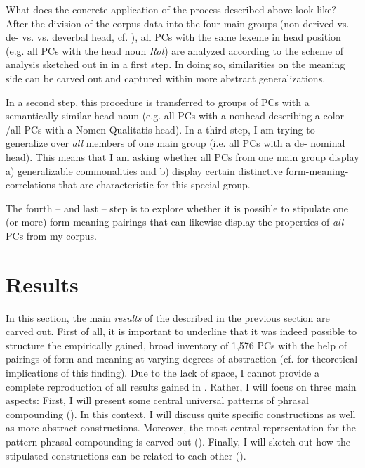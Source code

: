 \documentclass[output=paper]{LSP/langsci}
\begin{document}
What does the concrete application of the process described above look like? After the division of the corpus data into the four main groups (non-derived vs. de- vs.  vs. deverbal head, cf. ), all PCs with the same lexeme in head position (e.g. all PCs with the head noun \textit{Rot}) are analyzed according to the scheme of analysis sketched out in  in a first step. In doing so, similarities on the meaning side can be carved out and captured within more abstract generalizations. 



In a second step, this procedure is transferred to groups of PCs with a semantically similar head noun (e.g. all PCs with a nonhead describing a color \slash  all PCs with a Nomen Qualitatis head). In a third step, I am trying to generalize over \textit{all} members of one main group (i.e. all PCs with a de- nominal head). This means that I am asking whether all PCs from one main group display a) generalizable commonalities and b) display certain distinctive form-meaning-correlations that are characteristic for this special group. 



The fourth -- and last -- step is to explore whether it is possible to stipulate one (or more) form-meaning pairings that can likewise display the properties of \textit{all} PCs from my corpus. 


\section{Results}\label{sec:hein:3}

In this section, the main \textit{results} of the  described in the previous section are carved out. First of all, it is important to underline that it was indeed possible to structure the empirically gained, broad inventory of 1,576 PCs with the help of pairings of form and meaning at varying degrees of abstraction (cf.  for theoretical implications of this finding). Due to the lack of space, I cannot provide a complete reproduction of all results gained in \citet{Hein2015}.  Rather, I will focus on three main aspects: First, I will present some central universal patterns of phrasal compounding (). In this context, I will discuss quite specific constructions as well as more abstract constructions.  Moreover, the most central representation for the pattern phrasal compounding is carved out (). Finally, I will sketch out how the stipulated constructions can be related to each other ().
\end{document}
